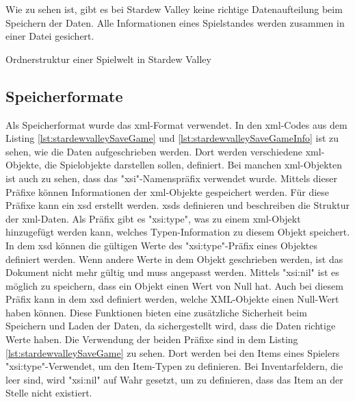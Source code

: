 Wie zu sehen ist, gibt es bei Stardew Valley keine richtige Datenaufteilung beim Speichern der Daten. Alle Informationen eines Spielstandes werden zusammen in einer Datei gesichert.

\begin{listing}[htp]
    \caption{Ordnerstruktur einer Spielwelt in Stardew Valley}
    \label{lst:ordnerStrukturStardewValley}
\end{listing}

\subsection{Speicherformate} \label{ssec:speicherformateStardew}
Als Speicherformat wurde das \ac{xml}-Format verwendet. In den \ac{xml}-Codes aus dem Listing \ref{lst:stardewvalleySaveGame} und \ref{lst:stardewvalleySaveGameInfo} ist zu sehen, wie die Daten aufgeschrieben werden. Dort werden verschiedene \ac{xml}-Objekte, die Spielobjekte darstellen sollen, definiert. Bei manchen \ac{xml}-Objekten ist auch zu sehen, dass das "xsi"-Namenspräfix verwendet wurde. Mittels dieser Präfixe können Informationen der \ac{xml}-Objekte gespeichert werden. Für diese Präfixe kann ein \ac{xsd} erstellt werden. \acp{xsd} definieren und beschreiben die Struktur der \ac{xml}-Daten. Als Präfix gibt es "xsi:type", was zu einem \ac{xml}-Objekt hinzugefügt werden kann, welches Typen-Information zu diesem Objekt speichert. In dem \ac{xsd} können die gültigen Werte des "xsi:type"-Präfix eines Objektes definiert werden. Wenn andere Werte in dem Objekt geschrieben werden, ist das Dokument nicht mehr gültig und muss angepasst werden. Mittels "xsi:nil" ist es möglich zu speichern, dass ein Objekt einen Wert von Null hat. Auch bei diesem Präfix kann in dem \ac{xsd} definiert werden, welche XML-Objekte einen Null-Wert haben können. Diese Funktionen bieten eine zusätzliche Sicherheit beim Speichern und Laden der Daten, da sichergestellt wird, dass die Daten richtige Werte haben.\cite{w3Schema} Die Verwendung der beiden Präfixe sind in dem Listing \ref{lst:stardewvalleySaveGame} zu sehen. Dort werden bei den Items eines Spielers "xsi:type"-Verwendet, um den Item-Typen zu definieren. Bei Inventarfeldern, die leer sind, wird "xsi:nil" auf Wahr gesetzt, um zu definieren, dass das Item an der Stelle nicht existiert.

